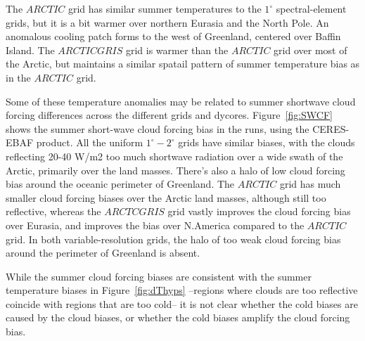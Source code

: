 \documentclass[draft]{agujournal2019}
\begin{document}
The $ARCTIC$ grid has similar summer temperatures to the $1^{\circ}$ spectral-element grids, but it is a bit warmer over northern Eurasia and the North Pole. An anomalous cooling patch forms to the west of Greenland, centered over Baffin Island. The $ARCTICGRIS$ grid is warmer than the $ARCTIC$ grid over most of the Arctic, but maintains a similar spatail pattern of summer temperature bias as in the $ARCTIC$ grid.

Some of these temperature anomalies may be related to summer shortwave cloud forcing differences across the different grids and dycores. Figure~\ref{fig:SWCF} shows the summer short-wave cloud forcing bias in the runs, using the CERES-EBAF product. All the uniform $1^{\circ}-2^{\circ}$ grids have similar biases, with the clouds reflecting 20-40 W/m2 too much shortwave radiation over a wide swath of the Arctic, primarily over the land masses. There's also a halo of low cloud forcing bias around the oceanic perimeter of Greenland. The $ARCTIC$ grid has much smaller cloud forcing biases over the Arctic land masses, although still too reflective, whereas the $ARCTCGRIS$ grid vastly improves the cloud forcing bias over Eurasia, and improves the bias over N.America compared to the $ARCTIC$ grid. In both variable-resolution grids, the halo of too weak cloud forcing bias around the perimeter of Greenland is absent.

While the summer cloud forcing biases are consistent with the summer temperature biases in Figure~\ref{fig:dThyps} --regions where clouds are too reflective coincide with regions that are too cold-- it is not clear whether the cold biases are caused by the cloud biases, or whether the cold biases amplify the cloud forcing bias.
\end{document}
